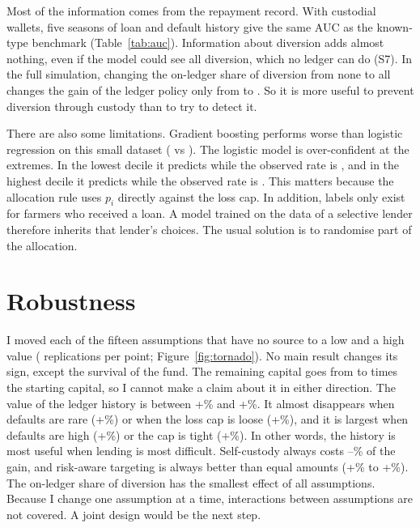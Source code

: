 \documentclass[11pt]{article}
\begin{document}
Most of the information comes from the repayment record. With custodial wallets, five seasons
of loan and default history give the same AUC as the known-type benchmark
(Table~\ref{tab:auc}). Information about diversion adds almost nothing, even if the model
could see all diversion, which no ledger can do (S7). In the full simulation, changing the
on-ledger share of diversion from none to all changes the gain of the ledger policy only from
\ObsZero{} to \ObsFull{}. So it is more useful to prevent diversion through custody than to
try to detect it.

There are also some limitations. Gradient boosting performs worse than logistic regression on
this small dataset (\GbmAuc{} vs \LogAuc{}). The logistic model is over-confident at the
extremes. In the lowest decile it predicts \CalLoPred{} while the observed rate is
\CalLoObs{}, and in the highest decile it predicts \CalHiPred{} while the observed rate is
\CalHiObs{}. This matters because the allocation rule uses $p_i$ directly against the loss
cap. In addition, labels only exist for farmers who received a loan. A model trained on the
data of a selective lender therefore inherits that lender's choices. The usual solution is to
randomise part of the allocation.

\section{Robustness}

I moved each of the fifteen assumptions that have no source to a low and a high value
(\SensReps{} replications per point; Figure~\ref{fig:tornado}). No main result changes its
sign, except the survival of the fund. The remaining capital goes from \SensFundLo{} to
\SensFundHi{} times the starting capital, so I cannot make a claim about it in either
direction. The value of the ledger history is between +\SensLedgerLo\% and +\SensLedgerHi\%.
It almost disappears when defaults are rare (+\SensDefLow\%) or when the loss cap is loose
(+\SensCapLoose\%), and it is largest when defaults are high (+\SensDefHigh\%) or the cap is
tight (+\SensCapTight\%). In other words, the history is most useful when lending is most
difficult. Self-custody always costs \SensCustLo--\SensCustHi\% of the gain, and risk-aware
targeting is always better than equal amounts (+\SensTargetLo\% to +\SensTargetHi\%). The
on-ledger share of diversion has the smallest effect of all assumptions. Because I change one
assumption at a time, interactions between assumptions are not covered. A joint design would
be the next step.
\end{document}
